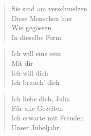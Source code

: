 \documentclass[twocolumn]{article}
\begin{document}
	\begin{verse}	
		Sie sind am verschmelzen \\
		Diese Menschen hier \\
		Wie gegossen \\
		In dieselbe Form \\
	\end{verse}
	
	\begin{verse}
		Ich will eins sein \\
		Mit dir \\
		Ich will dich \\
		Ich brauch' dich \\
	\end{verse}
	
	\begin{verse}	
		Ich liebe dich, Julia \\
		Für alle Gezeiten \\
		Ich erwarte mit Freuden \\
		Unser Jubeljahr \\
	\end{verse}
\end{document}
